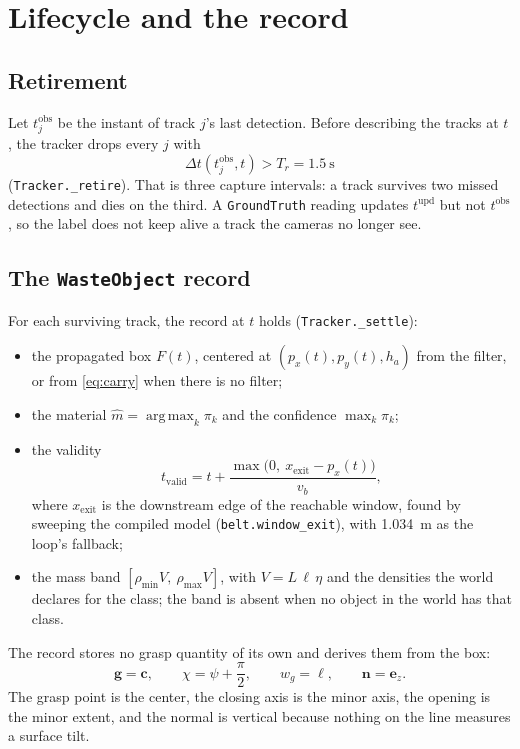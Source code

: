 \documentclass[11pt,a4paper]{article}
\theoremstyle{definition}
\theoremstyle{remark}
\newcommand{\ez}{\mathbf{e}_z}
\newcommand{\code}[1]{\texttt{#1}}
\DeclareMathOperator*{\argmax}{arg\,max}
\begin{document}
\section{Lifecycle and the record}
\label{sec:record}

\subsection{Retirement}

Let $t^{\text{obs}}_j$ be the instant of track $j$'s last detection. Before
describing the tracks at $t$, the tracker drops every $j$ with
\begin{equation}
\Delta t(t^{\text{obs}}_j, t) > T_r = 1.5\ \text{s}
\end{equation}
(\code{Tracker.\_retire}). That is three capture intervals: a track survives two
missed detections and dies on the third. A \code{GroundTruth} reading updates
$t^{\text{upd}}$ but not $t^{\text{obs}}$, so the label does not keep alive a
track the cameras no longer see.

\subsection{The \code{WasteObject} record}

For each surviving track, the record at $t$ holds (\code{Tracker.\_settle}):
\begin{itemize}[leftmargin=*]
\item the propagated box $F(t)$, centered at $(p_x(t), p_y(t), h_a)$ from the
  filter, or from \eqref{eq:carry} when there is no filter;
\item the material $\hat m = \argmax_k \pi_k$ and the confidence $\max_k\pi_k$;
\item the validity
  \begin{equation}
  t_{\text{valid}} = t + \frac{\max\bigl(0,\ x_{\text{exit}} - p_x(t)\bigr)}{v_b},
  \end{equation}
  where $x_{\text{exit}}$ is the downstream edge of the reachable window, found
  by sweeping the compiled model (\code{belt.window\_exit}), with 1.034~m as the
  loop's fallback;
\item the mass band $[\rho_{\min}V,\ \rho_{\max}V]$, with $V = L\,\ell\,\eta$ and
  the densities the world declares for the class; the band is absent when no
  object in the world has that class.
\end{itemize}
The record stores no grasp quantity of its own and derives them from the box:
\begin{equation}
\label{eq:grasp-record}
\mathbf{g} = \mathbf{c},\qquad
\chi = \psi + \frac{\pi}{2},\qquad
w_g = \ell,\qquad
\mathbf{n} = \ez .
\end{equation}
The grasp point is the center, the closing axis is the minor axis, the opening is
the minor extent, and the normal is vertical because nothing on the line measures
a surface tilt.
\end{document}
